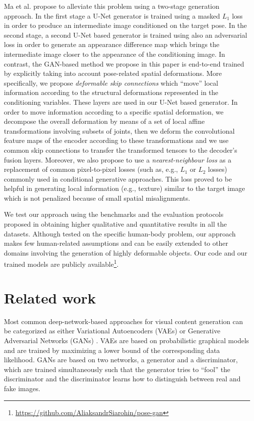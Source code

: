 \documentclass[10pt,twocolumn,letterpaper]{article}
\begin{document}
Ma et al. \cite{ma2017pose} propose to alleviate this problem using a two-stage generation approach. In the first stage a U-Net generator is trained using a masked $L_1$ loss in order to produce an intermediate image conditioned on the target pose. In the second stage, a second U-Net based generator is trained using also an adversarial loss in order to generate an appearance difference map which brings the  intermediate image closer to the appearance of the conditioning image.
In contrast, the GAN-based method we propose in this paper  is end-to-end trained
  by explicitly taking into account  pose-related spatial deformations. More specifically, we propose {\em deformable skip connections} which ``move'' local information according to the structural deformations represented in the  conditioning variables. These layers are used  in our U-Net based generator. 
In order to  move information according to a specific spatial deformation,  we decompose the overall  deformation by means of a set of 
local affine  transformations involving subsets of joints, 
then we deform the convolutional feature maps of the encoder  according to these  transformations and we use common skip connections to transfer the transformed tensors to the decoder's fusion layers.
Moreover, we also propose to use a {\em nearest-neighbour 
loss} as a replacement of common pixel-to-pixel losses (such as, e.g., $L_1$ or $L_2$ losses) commonly used in conditional generative approaches. This loss proved to be helpful in generating local information (e.g., texture) similar to the target image which is not penalized because of small spatial misalignments.

We test our approach using the benchmarks and the evaluation protocols proposed in \cite{ma2017pose} obtaining higher qualitative and quantitative results in all the datasets.
Although tested on the specific human-body problem, our approach makes few human-related assumptions and can be easily extended to other domains involving the generation of  highly deformable objects.
Our code   and our trained models
are publicly available\footnote{\url{https://github.com/AliaksandrSiarohin/pose-gan}}.
 \section{Related work}
\label{Related}

Most common deep-network-based
 approaches for visual content generation can be categorized as either Variational Autoencoders (VAEs) \cite{kingma2013auto} or Generative Adversarial Networks (GANs) \cite{goodfellow2014generative}. VAEs  are based on probabilistic graphical models and are trained by maximizing a lower bound of the corresponding data likelihood. GANs are based on two networks, a generator and a discriminator, which are trained simultaneously such that the generator tries to ``fool'' the discriminator and the discriminator learns how to distinguish between real and fake images.
\end{document}
